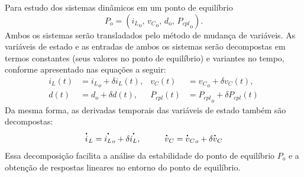 Para estudo dos sistemas dinâmicos em um ponto de equilíbrio \begin{equation} P_{\text{o}} = \left({i_L}_{\text{o}}, \, {v_C}_{\text{o}}, \, d_{\text{o}}, \, {P_{cpl}}_{\text{o}} \right). \end{equation} Ambos os sistemas serão transladados pelo método de mudança de variáveis. As variáveis de estado e as entradas de ambos os sistemas serão decompostas em termos constantes (seus valores no ponto de equilíbrio) e variantes no tempo, conforme apresentado nas equações a seguir: \begin{align}
  {i_L}(t) & = {i_L}_o + \delta i_L(t), & {v_C}(t)     & = {v_C}_o + \delta v_C(t), \label{eq:tranlation_decomposed_states} \\[12pt]
  {d}(t)   & = d_o + \delta d(t),       & {P_{cpl}}(t) & = {P_{cpl}}_o + \delta P_{cpl}(t) \label{eq:tranlation_decomposed_inputs}
\end{align} Da mesma forma, as derivadas temporais das variáveis de estado também são decompostas: \begin{align}
  \dt{i}_L = {\dt{i_L}}_o + \delta \dt{i_L}, \hspace{1cm}
  \dt{v}_C = {\dt{v}_C}_o + \delta \dt{v}_C
\end{align} Essa decomposição facilita a análise da estabilidade do ponto de equilíbrio $P_o$ e a obtenção de respostas lineares no entorno do ponto de equilíbrio.

